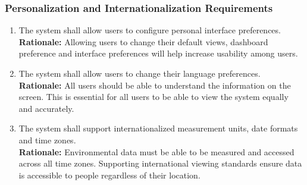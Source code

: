 \documentclass[]{article}
\begin{document}
\subsubsection{Personalization and Internationalization Requirements}
\label{ssub:personalization_and_internationalization_requirements}
\begin{enumerate}[{UH-PI}1. ]
	\item The system shall allow users to configure personal interface preferences.\\
	\textbf{Rationale:} Allowing users to change their default views, dashboard preference and interface preferences will help increase usability among users.
	\item The system shall allow users to change their language preferences.\\
	\textbf{Rationale:} All users should be able to understand the information on the screen. This is essential for all users to be able to view the system equally and accurately.
	\item The system shall support internationalized measurement units, date formats and time zones.\\
	\textbf{Rationale:} Environmental data must be able to be measured and accessed across all time zones. Supporting international viewing standards ensure data is accessible to people regardless of their location.
\end{enumerate}
\end{document}
